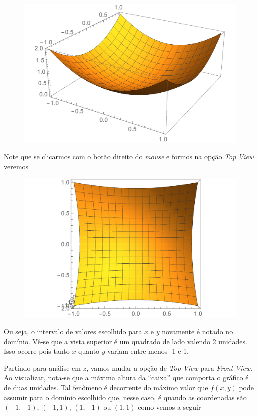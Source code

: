 \documentclass[a4paper, 12pt]{article}
\begin{document}
	\begin{figure}[!h]
		\centering
		\includegraphics[scale=.6]{images/parabola3d}
	\end{figure}

	Note que se clicarmos com o botão direito do \textit{mouse} e formos na opção \textit{Top View} veremos
	
	\begin{figure}[!h]
		\centering
		\includegraphics[scale=.55]{images/parabola3dtop}
	\end{figure}
	
	Ou seja, o intervalo de valores escolhido para $x$ e $y$ novamente é notado no domínio. Vê-se que a vista superior é um quadrado de lado valendo 2 unidades. Isso ocorre pois tanto $x$ quanto $y$ variam entre menos -1 e 1.
	
	Partindo para análise em $z$, vamos mudar a opção de \textit{Top View} para \textit{Front View}. Ao visualizar, nota-se que a máxima altura da ``caixa'' que comporta o gráfico é de duas unidades. Tal fenômeno é decorrente do máximo valor que $f(x,y)$ pode assumir para o domínio escolhido que, nesse caso, é quando as coordenadas são $(-1,-1)$, $(-1,1)$, $(1,-1)$ ou $(1,1)$ como vemos a seguir
	
\end{document}
